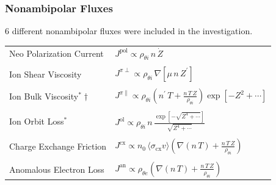 \documentclass[10pt]{beamer}
\begin{document}
\begin{frame} %
\frametitle{Nonambipolar Fluxes}
6 different nonambipolar fluxes were included in the investigation.
\parencite{stringer_explanation_1993} \parencite{itoh_role_1996} \parencite{toda_theoretical_1997} \parencite{staps_backstepping_2017} \\
\begin{center}
\begin{tabular}{l|l} \hline
	Neo Polarization Current & $J^\text{pol} \propto \rho_{\theta i}\, n \, \dot{Z}$ \\ \\
	Ion Shear Viscosity & $J^{\pi\perp} \propto \rho_{\theta i} \,
		\nabla\left[\mu \, n \, Z^\prime\right]$ \\ \\
	Ion Bulk Viscosity$^\text{*}\dagger$ & $J^{\pi\parallel} \propto \rho_{\theta i}
		\left(n^\prime\,T + \frac{n\,T\,Z}{\rho_{\theta i}}\right)
		\exp\left[-Z^2 + \dotsb\right]$ \\ \\
	Ion Orbit Loss$^\text{*}$ & $J^\text{ol} \propto \rho_{\theta i} \, n \,
		\frac{\exp\left[-\sqrt{Z^4 + \dotsb}\right]}{\sqrt{Z^4 + \dotsb}}$ \\ \\
	Charge Exchange Friction & $J^\text{cx} \propto n_0 \,
		\langle \sigma_\text{cx} v\rangle \left(\nabla (n\,T) +
		\frac{n\,T\,Z}{\rho_{\theta i}}\right)$ \\ \\
	Anomalous Electron Loss & $J^\text{an} \propto \rho_{\theta e}
		\left(\nabla (n\,T) + \frac{n\,T\,Z}{\rho_{\theta i}}\right)$

\end{tabular}
\end{center}
\end{frame}
\end{document}
